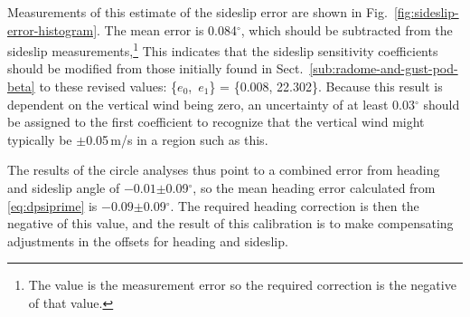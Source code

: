 \documentclass[12pt,twoside,english]{article}\usepackage[]{graphicx}\usepackage[]{color}
\let\OrgIndex\index
\renewcommand*{\index}[1]{\OrgIndex{#1}}
\begin{document}
Measurements of this estimate of the sideslip error are shown in Fig.~\ref{fig:sideslip-error-histogram}. The mean error is 0.084$^{\circ}$, which  should be subtracted from the sideslip measurements,\footnote{The value is the measurement error so the required correction is the negative of that value.} 
This indicates that the sideslip sensitivity coefficients should be modified from those initially found in Sect.~\ref{sub:radome-and-gust-pod-beta} to these revised values:\label{page:SSoffset} \{$e_{0}$,\, $e_{1}$\} = \{0.008, 22.302\}. Because this result is dependent on the vertical wind being zero, an uncertainty of at least 0.03$^{\circ}$ should be assigned to the first coefficient to recognize that the vertical wind might typically be $\pm$0.05\,m/s in a region such as this.%

The results of the circle analyses thus point to a combined error from heading and sideslip angle of %
\ensuremath{-0.01}$\pm$0.09$^{\circ}$, so the mean heading error  calculated from \eqref{eq:dpsiprime} is 
\ensuremath{-0.09}$\pm$0.09$^{\circ}$. 
The required heading correction is then the negative of this value, and the result of this calibration is to make compensating adjustments in the offsets for heading and sideslip. 

% 
\end{document}
